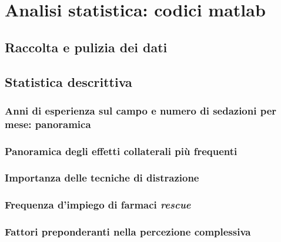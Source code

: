 \chapter{Analisi statistica: codici matlab\textsuperscript{\protect\tiny\sffamily\textregistered}}
\label{appendix:code}

\section{Raccolta e pulizia dei dati}
\label{code:wrangling}

    
    \newpage

\section{Statistica descrittiva}


    \subsection{Anni di esperienza sul campo e numero di sedazioni per mese: panoramica}
    \label{code:seniority-vs-experience}
    
    \newpage
    
    \subsection{Panoramica degli effetti collaterali più frequenti}
    \label{code:adverse-effects-incidence}
    
    \newpage

    \subsection{Importanza delle tecniche di distrazione}
    \label{code:misdirection-techniques}
    
    \newpage

    \subsection{Frequenza d'impiego di farmaci \emph{rescue}}
    \label{code:rescue}
    
    \newpage

    \subsection{Fattori preponderanti nella percezione complessiva}
    \label{code:satisfaction}
    
    \newpage

